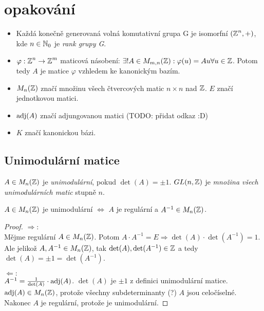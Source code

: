\section*{opakování}
\begin{itemize}
    \item Každá konečně generovaná volná komutativní grupa G je isomorfní $(\operatorname{\mathbb{Z}}^n, +)$, kde $n \in \operatorname{\mathbb{N}}_0$ je \emph{rank grupy G}.
    \item $\varphi: \operatorname{\mathbb{Z}}^n \rightarrow \operatorname{\mathbb{Z}}^m$ maticová násobení: $\exists ! A \in M_{m,n}(\operatorname{\mathbb{Z}}): \varphi(u) = Au \forall u \in \operatorname{\mathbb{Z}}$. Potom tedy $A$ je matice $\varphi$ vzhledem ke kanonickým bazím.
    \item $M_n(\operatorname{\mathbb{Z}})$ značí množinu všech čtvercových matic $n \times n$ nad $\operatorname{\mathbb{Z}}$. $E$ značí jednotkovou matici.
    \item $\operatorname{adj}(A)$ značí adjungovanou matici (TODO: přidat odkaz :D)
    \item $K$ značí kanonickou bázi.
\end{itemize}

\subsection{Unimodulární matice}
\begin{definition}
    $A \in M_n(\operatorname{\mathbb{Z}})$ je \emph{unimodulární}, pokud $\det(A) = \pm 1$. $GL(n, \operatorname{\mathbb{Z}})$ je \emph{množina všech unimodulárních matic} stupně $n$.
\end{definition}

\begin{lemma}
    $A \in M_n(\operatorname{\mathbb{Z}})$ je unimodulární $\Leftrightarrow$ $A$ je regulární a $A^{-1} \in M_n(\operatorname{\mathbb{Z}})$.
\end{lemma}
\begin{proof}
    $\Rightarrow:$\\
    Mějme regulární $A \in M_n(\operatorname{\mathbb{Z}})$. Potom $A\cdot A^{-1} = E \Rightarrow \det(A) \cdot \det(A^{-1}) = 1$. Ale jelikož $A, A^{-1} \in M_n(\operatorname{\mathbb{Z}})$, tak $\det(A), \det(A^{-1})\in \operatorname{\mathbb{Z}}$ a tedy $\det(A) = \pm 1 = \det(A^{-1})$.

    $\Leftarrow:$\\
    $A^{-1} = \frac{1}{\det(A)} \cdot \operatorname{adj}(A)$. $\det(A)$ je $\pm 1$ z definici unimodulární matice. $\operatorname{adj}(A) \in M_n(\operatorname{\mathbb{Z}})$, protože všechny subdeterminanty (?) $A$ jsou celočíselné. Nakonec $A$ je regulární, protože je unimodulární.
\end{proof}




